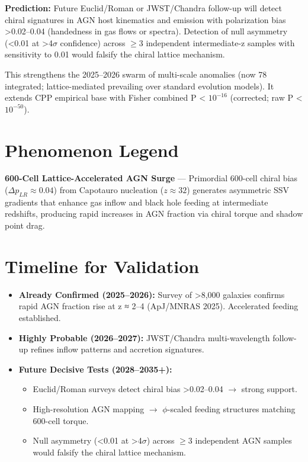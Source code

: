 \documentclass[11pt]{article}
\begin{document}
\textbf{Prediction:} Future Euclid/Roman or JWST/Chandra follow-up will detect chiral signatures in AGN host kinematics and emission with polarization bias >0.02--0.04 (handedness in gas flows or spectra). Detection of null asymmetry (<0.01 at >4$\sigma$ confidence) across $\geq 3$ independent intermediate-z samples with sensitivity to 0.01 would falsify the chiral lattice mechanism.

This strengthens the 2025--2026 swarm of multi-scale anomalies (now 78 integrated; lattice-mediated prevailing over standard evolution models). It extends CPP empirical base with Fisher combined P < $10^{-16}$ (corrected; raw P < $10^{-50}$).

\section{Phenomenon Legend}
\textbf{600-Cell Lattice-Accelerated AGN Surge} — Primordial 600-cell chiral bias ($\Delta p_{LR} \approx 0.04$) from Capotauro nucleation ($z \approx 32$) generates asymmetric SSV gradients that enhance gas inflow and black hole feeding at intermediate redshifts, producing rapid increases in AGN fraction via chiral torque and shadow point drag.

\section{Timeline for Validation}
\begin{itemize}
    \item \textbf{Already Confirmed (2025--2026):} Survey of >8,000 galaxies confirms rapid AGN fraction rise at z ≈ 2–4 (ApJ/MNRAS 2025). Accelerated feeding established.
    \item \textbf{Highly Probable (2026--2027):} JWST/Chandra multi-wavelength follow-up refines inflow patterns and accretion signatures.
    \item \textbf{Future Decisive Tests (2028--2035+):}
    \begin{itemize}
        \item Euclid/Roman surveys detect chiral bias >0.02--0.04 $\to$ strong support.
        \item High-resolution AGN mapping $\to$ $\phi$-scaled feeding structures matching 600-cell torque.
        \item Null asymmetry (<0.01 at >4$\sigma$) across $\geq 3$ independent AGN samples would falsify the chiral lattice mechanism.
    \end{itemize}
\end{itemize}
\end{document}
